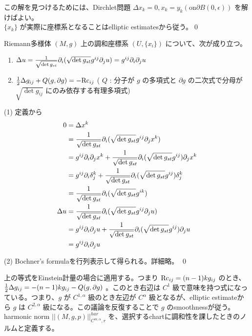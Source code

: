 \documentclass[dvipdfmx,a4paper]{jsarticle}
\theoremstyle{definition}
\newcommand{\der}{\partial}
\newcommand{\Rc}{{\rm Rc}}
\begin{document}
この解を見つけるためには、Dirchlet問題 $\Delta x_k=0,x_k=y_k (\mbox{on} \der B(0,\epsilon))$ を解けばよい。 \\
$\{x_k\}$ が実際に座標系となることはelliptic estimatesから従う。\qed

\lem\label{harm}  Riemann多様体 $(M,g)$ 上の調和座標系 $(U,\{x_i\})$ について、次が成り立つ。
\begin{enumerate}
    \item $\Delta u={1 \over \sqrt{\det g_{st}}} \der_i(\sqrt{\det g_{st}} g^{ij}\der_j u)=g^{ij}\der_i\der_j u$
    \item ${1 \over 2}\Delta g_{ij}+Q(g,\der g)=-\Rc_{ij}$ ( $Q$ : 分子が $g$ の多項式と $\der g$ の二次式で分母が $\sqrt{\det g_{ij}}$ にのみ依存する有理多項式)
\end{enumerate}

\prf 
(1) 定義から
\begin{align*}
    0 &= \Delta x^k \\
    &={1 \over \sqrt{\det g_{st}}} \der_i(\sqrt{\det g_{st}} g^{ij}\der_j x^k) \\
    &=g^{ij}\der_i\der_j x^k+{1 \over \sqrt{\det g_{st}}} \der_i(\sqrt{\det g_{st}} g^{ij})\der_j x^k \\
    &=g^{ij}\der_i\delta_j^k+{1 \over \sqrt{\det g_{st}}} \der_i(\sqrt{\det g_{st}} g^{ij})\delta_j^k\\
    &={1 \over \sqrt{\det g_{st}}} \der_i(\sqrt{\det g_{st}} g^{ik}) \\
    \Delta u&={1 \over \sqrt{\det g_{st}}} \der_i(\sqrt{\det g_{st}} g^{ij}\der_j u) \\
    &=g^{ij}\der_i\der_j u+{1 \over \sqrt{\det g_{st}}} \der_i(\sqrt{\det g_{st}} g^{ij})\der_j u \\
    &=g^{ij}\der_i\der_j u
\end{align*}

(2) Bochner's formulaを行列表示して得られる。詳細略。
\qed

上の等式をEinstein計量の場合に適用する。つまり $\Rc_{ij}=(n-1)kg_{ij}$ のとき、 ${1 \over 2}\Delta g_{ij}=-(n-1)kg_{ij}-Q(g,\der g)$ 。このとき右辺は $C^1$ 級で意味を持つ式になっている。つまり、$g$ が $C^{1,\alpha}$ 級のとき左辺が $C^{\alpha}$ 級となるが、elliptic estimateから $g$ は $C^{2,\alpha}$ 級になる。この議論を反復することで $g$ のsmoothnessが従う。\\

harmonic norm $||(M,g,p)||^{har}_{C^{m,\alpha},r}$ を、選択するchartに調和性を課したときのノルムと定義する。
\end{document}
